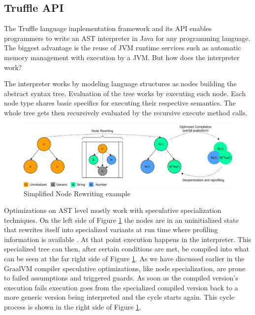 \subsection{Truffle API}
The Truffle language implementation framework and its API enables programmers to write an AST interpreter in Java for any programming language. The biggest advantage is the reuse of JVM runtime services such as automatic memory management with execution by a JVM. But how does the interpreter work?

The interpreter works by modeling language structures as nodes building the abstract syntax tree. Evaluation of the tree works by executing each node. Each node type shares basic specifics for executing their respective semantics. The whole tree gets then recursively evaluated by the recursive execute method calls.

\begin{figure}[h!]
    \centering
    \includegraphics[scale=0.7]{figures/NodeJIT.png}
    \caption{Simplified Node Rewriting example}
    \label{fig:trufNR}
\end{figure}

Optimizations on AST level mostly work with speculative specialization techniques. On the left side of Figure \ref{fig:trufNR} the nodes are in an uninitialized state that rewrites itself into specialized variants at run time where profiling information is available \cite{wuerthSelf}. At that point execution happens in the interpreter. This specialized tree can then, after certain conditions are met, be compiled into what can be seen at the far right side of Figure \ref{fig:trufNR}. As we have discussed earlier in the GraalVM compiler speculative optimizations, like node specialization, are prone to failed assumptions and triggered guards. As soon as the compiled version's execution fails execution goes from the specialized compiled version back to a more generic version being interpreted and the cycle starts again. This cycle process is shown in the right side of Figure \ref{fig:trufNR}.

